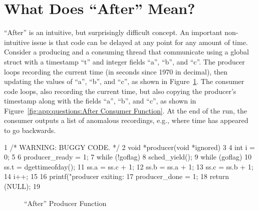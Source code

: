 
\section{What Does ``After'' Mean?}
\label{sec:app:questions:What Does ``After'' Mean?}

``After'' is an intuitive, but surprisingly difficult concept.
An important non-intuitive issue is that code can be delayed at
any point for any amount of time.
Consider a producing and a consuming thread that communicate using
a global struct with a timestamp ``t'' and integer fields ``a'', ``b'',
and ``c''.
The producer loops recording the current time
(in seconds since 1970 in decimal),
then updating the values of ``a'', ``b'', and ``c'',
as shown in Figure~\ref{fig:app:questions:After Producer Function}.
The consumer code loops, also recording the current time, but also
copying the producer's timestamp along with the fields ``a'',
``b'', and ``c'', as shown in
Figure~\ref{fig:app:questions:After Consumer Function}.
At the end of the run, the consumer outputs a list of anomalous recordings,
e.g., where time has appeared to go backwards.

{ \scriptsize
\begin{verbbox}
  1 /* WARNING: BUGGY CODE. */
  2 void *producer(void *ignored)
  3 {
  4   int i = 0;
  5
  6   producer_ready = 1;
  7   while (!goflag)
  8     sched_yield();
  9   while (goflag) {
 10     ss.t = dgettimeofday();
 11     ss.a = ss.c + 1;
 12     ss.b = ss.a + 1;
 13     ss.c = ss.b + 1;
 14     i++;
 15   }
 16   printf("producer exiting: %
 17   producer_done = 1;
 18   return (NULL);
 19 }
\end{verbbox}
}
\begin{figure}[htbp]
\centering
\theverbbox
\caption{``After'' Producer Function}
\label{fig:app:questions:After Producer Function}
\end{figure}


